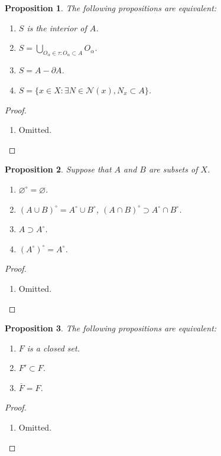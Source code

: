 \documentclass{report}
\newtheorem{proposition}{Proposition}[section]
\theoremstyle{nonumberplain}
\newtheorem{proof}{Proof.}
\begin{document}
\begin{proposition}
	The following propositions are equivalent:
	\begin{enumerate}	
		\item $S$ is the interior of $A$.
		\item $S=\bigcup\limits_{O_\alpha\in\tau:O_\alpha\subset A}O_\alpha$.
		\item $S=A-\partial A$.
		\item $S=\{x\in X:\exists N\in\mathcal{N}(x),N_x\subset A\}$.
	\end{enumerate}
\end{proposition}
\begin{proof}~\\ \vspace{-1em}
	\begin{enumerate}	
		\item Omitted.
	\end{enumerate}
\end{proof}
\begin{proposition}
	Suppose that $A$ and $B$ are subsets of $X$.
	\begin{enumerate}
		\item $\varnothing^{\circ}=\varnothing$.	
		\item $(A \cup B)^{\circ}=A^{\circ}\cup B^{\circ}$,  $(A \cap B)^{\circ}\supset A^{\circ}\cap B^{\circ}$.
		\item $A\supset A^{\circ}$.
		\item $\left(A^{\circ}\right)^{\circ}=A^{\circ}$.
	\end{enumerate}
\end{proposition}

\begin{proof}~\\ \vspace{-1em}
	\begin{enumerate}	
		\item Omitted.
	\end{enumerate}
\end{proof}

\begin{proposition}
	The following propositions are equivalent:
	\begin{enumerate}
		\item $F$ is a closed set.	
		\item $F'\subset F$.
		\item $\overline{F}=F$.
	\end{enumerate}
\end{proposition}
\begin{proof}~\\ \vspace{-1em}
	\begin{enumerate}	
		\item Omitted.
	\end{enumerate}
\end{proof}
\end{document}

